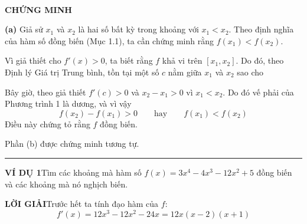 \vspace{1.0em}

\noindent
\begin{minipage}[t]{4.8cm}
  \vspace{0pt}
  ~
\end{minipage}\hfill
\begin{minipage}[t]{12.3cm}
  \vspace{0pt}
  \noindent\textbf{\color{stewartdarkred}\textsf{CHỨNG MINH}}\par\vspace{3pt}
  \noindent\textbf{(a)}\; Giả sử $x_1$ và $x_2$ là hai số bất kỳ trong khoảng với $x_1 < x_2$. Theo định nghĩa của hàm số đồng biến (Mục 1.1), ta cần chứng minh rằng $f(x_1) < f(x_2)$.
  \par\vspace{3pt}
  Vì giả thiết cho $f'(x) > 0$, ta biết rằng $f$ khả vi trên $[x_1, x_2]$. Do đó, theo Định lý Giá trị Trung bình, tồn tại một số $c$ nằm giữa $x_1$ và $x_2$ sao cho
  \vspace{2pt}
  \begin{center}
  \end{center}
  \vspace{2pt}
  Bây giờ, theo giả thiết $f'(c) > 0$ và $x_2 - x_1 > 0$ vì $x_1 < x_2$. Do đó vế phải của Phương trình 1 là dương, và vì vậy
  $$f(x_2) - f(x_1) > 0 \qquad \text{hay} \qquad f(x_1) < f(x_2)$$
  Điều này chứng tỏ rằng $f$ đồng biến.
  \par\vspace{3pt}
  \noindent Phần (b) được chứng minh tương tự.\hfill\textcolor{stewartred}{\rule{1.2ex}{1.2ex}}

  \vspace{1.0em}
  \noindent\textbf{\color{stewartblue}\textsf{VÍ DỤ 1}}\quad Tìm các khoảng mà hàm số $f(x) = 3x^4 - 4x^3 - 12x^2 + 5$ đồng biến và các khoảng mà nó nghịch biến.

  \vspace{0.6em}
  \noindent\textbf{\color{stewartblue}\textsf{LỜI GIẢI}}\quad Trước hết ta tính đạo hàm của $f$:
  $$f'(x) = 12x^3 - 12x^2 - 24x = 12x(x - 2)(x + 1)$$
\end{minipage}

